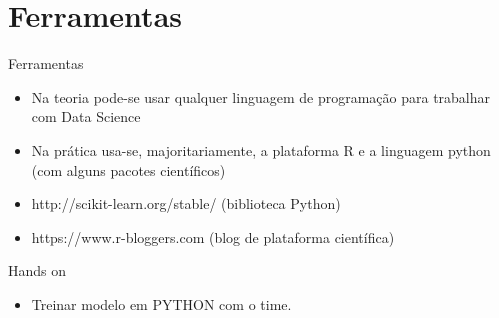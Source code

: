 \section{Ferramentas}

\begin{frame}	
	\begin{block}{Ferramentas}	
		\begin{itemize}
			\item Na teoria pode-se usar qualquer linguagem de programação para trabalhar com Data Science
			\item Na prática usa-se, majoritariamente, a plataforma R e a linguagem python (com alguns pacotes científicos)
			\item http://scikit-learn.org/stable/ (biblioteca Python)
			\item https://www.r-bloggers.com (blog de plataforma científica)
			
		\end{itemize}		
	\end{block}
\end{frame}

\begin{frame}	
	\begin{block}{Hands on}	
		\begin{itemize}
			\item Treinar modelo em PYTHON com o time.
		\end{itemize}		
	\end{block}
\end{frame}
